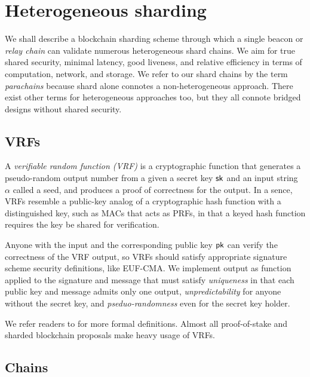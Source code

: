 
\section{Heterogeneous sharding}
\label{sec:parachains} %

We shall describe a blockchain sharding scheme through which a single beacon or {\em relay chain} can validate numerous heterogeneous shard chains.  We aim for true shared security, minimal latency, good liveness, and relative efficiency in terms of computation, network, and storage.  We refer to our shard chains by the term {\em parachains} because shard alone connotes a non-heterogeneous approach.  There exist other terms for heterogeneous approaches too, but they all connote bridged designs without shared security.

\subsection{VRFs}

A {\em verifiable random function (VRF)} is a cryptographic function that generates a pseudo-random output number from a given a secret key $\mathsf{sk}$ and an input string $\alpha$ called a seed, and produces a proof of correctness for the output.  In a sence, VRFs resemble a public-key analog of a cryptographic hash function with a distinguished key, such as MACs that acts as PRFs, in that a keyed hash function requires the key be shared for verification. 

Anyone with the input and the corresponding public key $\mathsf{pk}$ can verify the correctness of the VRF output, so VRFs should satisfy appropriate signature scheme security definitions, like EUF-CMA.  We implement output as function applied to the signature and message that must satisfy {\em uniqueness} in that each public key and message admits only one output, {\em unpredictability} for anyone without the secret key, and {\em pseduo-randomness} even for the secret key holder.

We refer readers to \cite[\S1]{Sassafras} for more formal definitions.
Almost all proof-of-stake and sharded blockchain proposals make heavy usage of VRFs.

\subsection{Chains}

